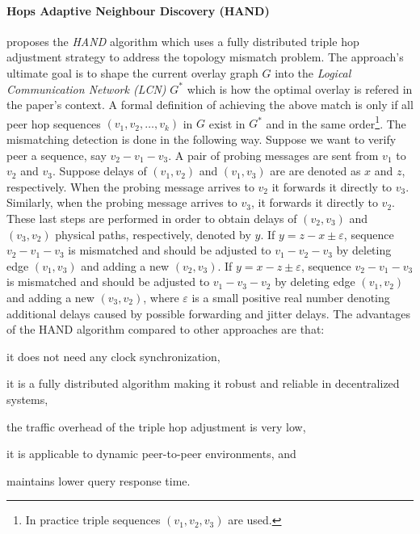 \paragraph*{\bf Hops Adaptive Neighbour Discovery (HAND)}
\cite{chen_hand_2006} proposes the \emph{HAND} algorithm which uses a
fully distributed triple hop adjustment strategy to address the topology
mismatch problem. The approach's ultimate goal is to shape the current overlay
graph $G$ into the \emph{Logical Communication Network (LCN)} $G^{*}$ which is
how the optimal overlay is refered in the paper's context. A formal
definition of achieving the above match is only if all peer hop sequences $(v_1,
v_2, \ldots, v_k)$ in $G$ exist in $G^{*}$ and in the same order\footnote{In
practice triple sequences $(v_1, v_2, v_3)$ are used.}. The mismatching
detection is done in the following way. Suppose we want to verify peer a
sequence, say $v_2-v_1-v_3$. A pair of probing messages are sent from $v_1$ to
$v_2$ and $v_3$. Suppose delays of $(v_1,v_2)$ and $(v_1,v_3)$ are are denoted
as $x$ and $z$, respectively. When the probing message arrives to $v_2$ it
forwards it directly to $v_3$. Similarly, when the probing message arrives to
$v_3$, it forwards it directly to $v_2$. These last steps are performed in order
to obtain delays of $(v_2,v_3)$ and $(v_3,v_2)$ physical paths, respectively,
denoted by $y$. If $y=z-x\pm\varepsilon$, sequence $v_2-v_1-v_3$ is mismatched
and should be adjusted to $v_1-v_2-v_3$ by deleting edge $(v_1,v_3)$ and adding
a new $(v_2,v_3)$. If $y=x-z\pm\varepsilon$, sequence $v_2-v_1-v_3$ is
mismatched and should be adjusted to $v_1-v_3-v_2$ by deleting edge $(v_1,v_2)$
and adding a new $(v_3,v_2)$, where $\varepsilon$ is a small positive real
number denoting additional delays caused by possible forwarding and jitter
delays. The advantages of the HAND algorithm compared to other approaches are
that:
\begin{inparaenum}
  \item it does not need any clock synchronization,
  \item it is a fully distributed algorithm making it robust and reliable in
        decentralized systems,
  \item the traffic overhead of the triple hop adjustment is very low,
  \item it is applicable to dynamic peer-to-peer environments, and
  \item maintains lower query response time.
\end{inparaenum}

